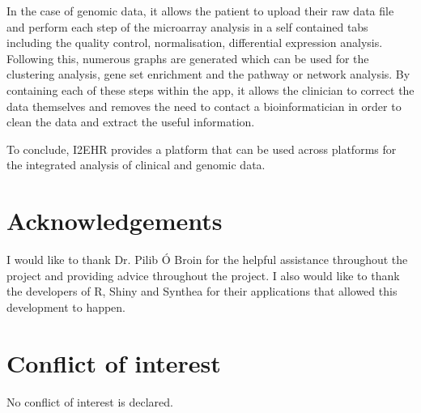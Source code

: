 \documentclass{bioinfo}
\begin{document}
\begin{Discussion}
In the case of genomic data, it allows the patient to upload their raw data file and perform each step of the microarray analysis in a self contained tabs including the quality control, normalisation, differential expression analysis. Following this, numerous graphs are generated which can be used for the clustering analysis, gene set enrichment and the pathway or network analysis. By containing each of these steps within the app, it allows the clinician to correct the data themselves and removes the need to contact a bioinformatician in order to clean the data and extract the useful information.

To conclude, I2EHR provides a platform that can be used across platforms for the integrated analysis of clinical and genomic data.

\end{Discussion} 


%
%


\section*{Acknowledgements}
I would like to thank Dr. Pilib Ó Broin for the helpful assistance throughout the project and providing advice throughout the project. I also would like to thank the developers of R, Shiny and Synthea for their applications that allowed this development to happen.


\section*{Conflict of interest}
No conflict of interest is declared. 


%
%
%
%
%
%
%
%

\vspace*{-12pt}

\end{document}
